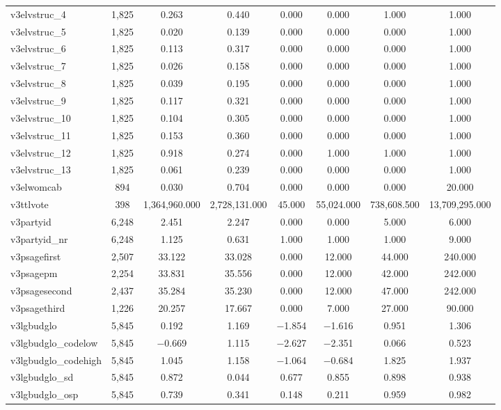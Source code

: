 \begin{table}[!htbp]
\begin{tabular}{@{\extracolsep{5pt}}lccccccc}
v3elvstruc\_4 & 1,825 & 0.263 & 0.440 & 0.000 & 0.000 & 1.000 & 1.000 \\ 
v3elvstruc\_5 & 1,825 & 0.020 & 0.139 & 0.000 & 0.000 & 0.000 & 1.000 \\ 
v3elvstruc\_6 & 1,825 & 0.113 & 0.317 & 0.000 & 0.000 & 0.000 & 1.000 \\ 
v3elvstruc\_7 & 1,825 & 0.026 & 0.158 & 0.000 & 0.000 & 0.000 & 1.000 \\ 
v3elvstruc\_8 & 1,825 & 0.039 & 0.195 & 0.000 & 0.000 & 0.000 & 1.000 \\ 
v3elvstruc\_9 & 1,825 & 0.117 & 0.321 & 0.000 & 0.000 & 0.000 & 1.000 \\ 
v3elvstruc\_10 & 1,825 & 0.104 & 0.305 & 0.000 & 0.000 & 0.000 & 1.000 \\ 
v3elvstruc\_11 & 1,825 & 0.153 & 0.360 & 0.000 & 0.000 & 0.000 & 1.000 \\ 
v3elvstruc\_12 & 1,825 & 0.918 & 0.274 & 0.000 & 1.000 & 1.000 & 1.000 \\ 
v3elvstruc\_13 & 1,825 & 0.061 & 0.239 & 0.000 & 0.000 & 0.000 & 1.000 \\ 
v3elwomcab & 894 & 0.030 & 0.704 & 0.000 & 0.000 & 0.000 & 20.000 \\ 
v3ttlvote & 398 & 1,364,960.000 & 2,728,131.000 & 45.000 & 55,024.000 & 738,608.500 & 13,709,295.000 \\ 
v3partyid & 6,248 & 2.451 & 2.247 & 0.000 & 0.000 & 5.000 & 6.000 \\ 
v3partyid\_nr & 6,248 & 1.125 & 0.631 & 1.000 & 1.000 & 1.000 & 9.000 \\ 
v3psagefirst & 2,507 & 33.122 & 33.028 & 0.000 & 12.000 & 44.000 & 240.000 \\ 
v3psagepm & 2,254 & 33.831 & 35.556 & 0.000 & 12.000 & 42.000 & 242.000 \\ 
v3psagesecond & 2,437 & 35.284 & 35.230 & 0.000 & 12.000 & 47.000 & 242.000 \\ 
v3psagethird & 1,226 & 20.257 & 17.667 & 0.000 & 7.000 & 27.000 & 90.000 \\ 
v3lgbudglo & 5,845 & 0.192 & 1.169 & $-$1.854 & $-$1.616 & 0.951 & 1.306 \\ 
v3lgbudglo\_codelow & 5,845 & $-$0.669 & 1.115 & $-$2.627 & $-$2.351 & 0.066 & 0.523 \\ 
v3lgbudglo\_codehigh & 5,845 & 1.045 & 1.158 & $-$1.064 & $-$0.684 & 1.825 & 1.937 \\ 
v3lgbudglo\_sd & 5,845 & 0.872 & 0.044 & 0.677 & 0.855 & 0.898 & 0.938 \\ 
v3lgbudglo\_osp & 5,845 & 0.739 & 0.341 & 0.148 & 0.211 & 0.959 & 0.982 \\ 

\end{tabular}
\end{table}
